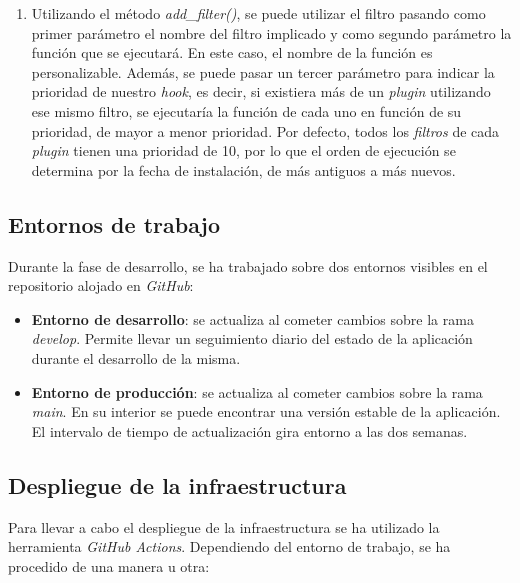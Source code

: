 
\begin{enumerate}
\def\labelenumi{\arabic{enumi}.}
\setcounter{enumi}{1}
\tightlist
\item
  Utilizando el método \emph{add\_filter()}, se puede utilizar el filtro
  pasando como primer parámetro el nombre del filtro implicado y como
  segundo parámetro la función que se ejecutará. En este caso, el nombre
  de la función es personalizable. Además, se puede pasar un tercer
  parámetro para indicar la prioridad de nuestro \emph{hook}, es decir,
  si existiera más de un \emph{plugin} utilizando ese mismo filtro, se
  ejecutaría la función de cada uno en función de su prioridad, de mayor
  a menor prioridad. Por defecto, todos los \emph{filtros} de cada
  \emph{plugin} tienen una prioridad de 10, por lo que el orden de
  ejecución se determina por la fecha de instalación, de más antiguos a
  más nuevos.
\end{enumerate}


\subsection{Entornos de trabajo}

Durante la fase de desarrollo, se ha trabajado sobre dos entornos visibles 
en el repositorio alojado en \emph{GitHub}:

\begin{itemize}
\tightlist
\item
  \textbf{Entorno de desarrollo}: se actualiza al cometer cambios sobre
  la rama \emph{develop}. Permite llevar un seguimiento diario del
  estado de la aplicación durante el desarrollo de la misma.
\item
  \textbf{Entorno de producción}: se actualiza al cometer cambios sobre
  la rama \emph{main}. En su interior se puede encontrar una versión
  estable de la aplicación. El intervalo de tiempo de actualización gira
  entorno a las dos semanas. 
\end{itemize}

\subsection{Despliegue de la infraestructura}

Para llevar a cabo el despliegue de la infraestructura se ha utilizado
la herramienta \emph{GitHub Actions}. Dependiendo del entorno de
trabajo, se ha procedido de una manera u otra:

